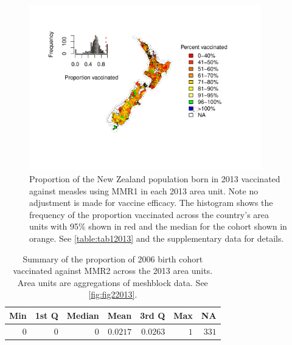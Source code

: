 \documentclass{article}
\begin{document}
\begin{figure}
\begin{center}
    \includegraphics[width=0.9\textwidth]{nir_census_MMR1_NIR_2013.pdf}
 \end{center}
    \caption{Proportion of the New Zealand population born in 2013 vaccinated against measles using MMR1 in each 2013 area unit. Note no adjustment is made for vaccine efficacy. The histogram shows the frequency of the proportion vaccinated across the country's area units with 95\% shown in red and the median for the cohort shown in orange. See \autoref{table:tab12013} and the supplementary data for details.}
\label{fig:fig12013}
\end{figure}

 \vspace{5mm} %
\begin{table}
\begin{center}
\begin{tabular}{rrrrrrr}
\hline\hline
\multicolumn{1}{c}{Min}&\multicolumn{1}{c}{1st Q}&\multicolumn{1}{c}{Median}&\multicolumn{1}{c}{Mean}&\multicolumn{1}{c}{3rd Q}&\multicolumn{1}{c}{Max}&\multicolumn{1}{c}{NA}\tabularnewline
\hline
$0$&$0$&$0$&$0.0217$&$0.0263$&$1$&$331$\tabularnewline
\hline
\end{tabular}\end{center}\caption{Summary of the proportion of 2006 birth cohort vaccinated against MMR2 across the 2013 area units. Area units are aggregations of meshblock data. See \autoref{fig:fig22013}.}
\label{table:tab22013}
\end{table}
\end{document}
